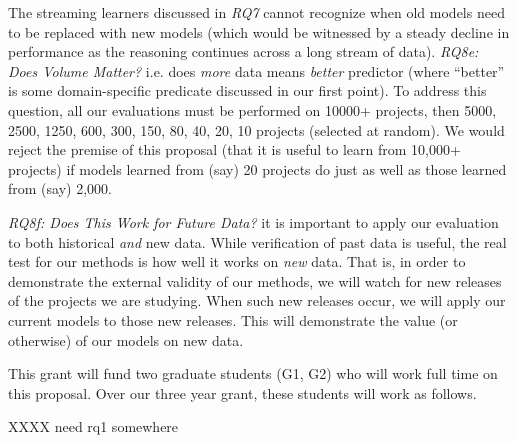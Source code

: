 \item The streaming learners  discussed in {\em RQ7} cannot recognize when
old models need to be replaced with new models (which would be witnessed by a steady decline in performance as the reasoning continues across a long stream of data).
\ei
{\em RQ8e: Does Volume Matter?} i.e. does {\em more}
data means {\em better} predictor (where ``better'' is some domain-specific predicate discussed in our first point). To address this question, all our evaluations must be performed on 10000+ projects,
then 5000, 2500, 1250, 600, 300, 150, 80, 40, 20, 10  projects (selected at random).
We would reject the premise of this proposal (that it is useful to learn from 10,000+ projects)
if models learned from (say) 20 projects do just as well as those learned from (say) 2,000.



{\em RQ8f: Does This Work for Future Data?}
it is important to apply our evaluation to both historical  {\em and } new data.
While verification of past data is useful, the real test for our methods is how well
it works on {\em new} data. That is, in order to demonstrate the external validity of our methods, we will watch for new releases of the projects we are studying. When such new releases occur, we will apply our current models to those new releases. This will demonstrate the value (or otherwise) of our models on new data.
 

This grant will fund two graduate students (G1, G2) who will work full time on this proposal.
Over our three year grant, these students will work as follows. 

XXXX need rq1 somewhere

